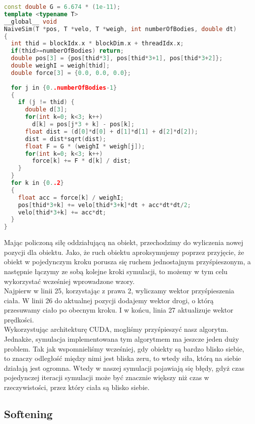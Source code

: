 \documentclass[14pt,twoside,a4paper]{article}
\theoremstyle{definition}
\begin{document}
\bigskip
{}\begin{lstlisting}[language=C++, frame=single, framerule=2pt, caption=Kernel NaiveSim]
const double G = 6.674 * (1e-11);
template <typename T>
__global__ void 
NaiveSim(T *pos, T *velo, T *weigh, int numberOfBodies, double dt) 
{
  int thid = blockIdx.x * blockDim.x + threadIdx.x;
  if(thid>=numberOfBodies) return;
  double pos[3] = {pos[thid*3], pos[thid*3+1], pos[thid*3+2]};
  double weighI = weigh[thid];
  double force[3] = {0.0, 0.0, 0.0};
  
  for j in {0..numberOfBodies-1}
  {
    if (j != thid) {
      double d[3];
      for(int k=0; k<3; k++) 
        d[k] = pos[j*3 + k] - pos[k];
      float dist = (d[0]*d[0] + d[1]*d[1] + d[2]*d[2]);
      dist = dist*sqrt(dist);
      float F = G * (weighI * weigh[j]);
      for(int k=0; k<3; k++)
        force[k] += F * d[k] / dist;	
    }
  }
  for k in {0..2}
  {
    float acc = force[k] / weighI;
    pos[thid*3+k] += velo[thid*3+k]*dt + acc*dt*dt/2;
    velo[thid*3+k] += acc*dt;
  }
}
\end{lstlisting}


Mając policzoną siłę oddziałującą na obiekt, przechodzimy do wyliczenia nowej pozycji dla obiektu. Jako, że ruch obiektu aproksymujemy poprzez przyjęcie, że obiekt w pojedynczym kroku porusza się ruchem jednostajnym przyśpieszonym, a następnie łączymy ze sobą kolejne kroki symulacji, to możemy w tym celu wykorzystać wcześniej wprowadzone wzory.\\ Najpierw w linii 25, korzystając z prawa 2, wyliczamy wektor przyśpieszenia ciała. W linii 26 do aktualnej pozycji dodajemy wektor drogi, o którą przesuwamy ciało po obecnym kroku. I w końcu, linia 27 aktualizuje wektor prędkości.\\
Wykorzystując architekturę CUDA, mogliśmy przyśpieszyć nasz algorytm. Jednakże, symulacja implementowana tym algorytmem ma jeszcze jeden duży problem. Tak jak wspomnieliśmy wcześniej, gdy obiekty są bardzo blisko siebie, to znaczy odległość między nimi jest bliska zeru, to wtedy siła, którą na siebie działają jest ogromna. Wtedy w naszej symulacji pojawiają się błędy, gdyż czas pojedynczej iteracji symulacji może być znacznie większy niż czas w rzeczywistości, przez który ciała są blisko siebie. 
\subsection{\Large Softening} 
\end{document}
